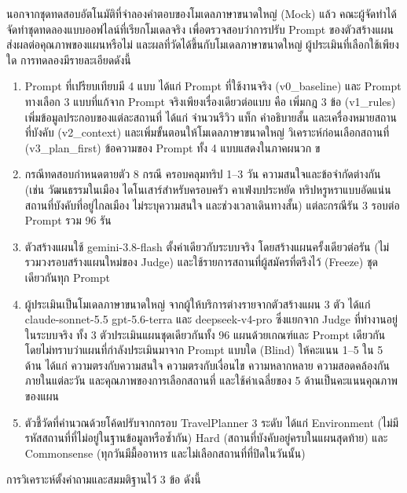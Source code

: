 นอกจากชุดทดสอบอัตโนมัติที่จำลองคำตอบของโมเดลภาษาขนาดใหญ่ (Mock) แล้ว คณะผู้จัดทำได้จัดทำชุดทดลองแบบออฟไลน์ที่เรียกโมเดลจริง เพื่อตรวจสอบว่าการปรับ Prompt ของตัวสร้างแผนส่งผลต่อคุณภาพของแผนหรือไม่ และผลที่วัดได้ขึ้นกับโมเดลภาษาขนาดใหญ่ ผู้ประเมินที่เลือกใช้เพียงใด การทดลองมีรายละเอียดดังนี้

\begin{enumerate}
\item Prompt ที่เปรียบเทียบมี 4 แบบ ได้แก่ Prompt ที่ใช้งานจริง (v0\_baseline) และ Prompt ทางเลือก 3 แบบที่แก้จาก Prompt จริงเพียงเรื่องเดียวต่อแบบ คือ เพิ่มกฎ 3 ข้อ (v1\_rules) เพิ่มข้อมูลประกอบของแต่ละสถานที่ ได้แก่ จำนวนรีวิว แท็ก คำอธิบายสั้น และเครื่องหมายสถานที่บังคับ (v2\_context) และเพิ่มขั้นตอนให้โมเดลภาษาขนาดใหญ่ วิเคราะห์ก่อนเลือกสถานที่ (v3\_plan\_first) ข้อความของ Prompt ทั้ง 4 แบบแสดงในภาคผนวก ข
\item กรณีทดสอบกำหนดตายตัว 8 กรณี ครอบคลุมทริป 1--3 วัน ความสนใจและข้อจำกัดต่างกัน (เช่น วัฒนธรรมในเมือง ไดโนเสาร์สำหรับครอบครัว คาเฟ่งบประหยัด ทริปหรูหราแบบอัดแน่น สถานที่บังคับที่อยู่ไกลเมือง ไม่ระบุความสนใจ และช่วงเวลาเดินทางสั้น) แต่ละกรณีรัน 3 รอบต่อ Prompt รวม 96 รัน
\item ตัวสร้างแผนใช้ gemini-3.8-flash ตั้งค่าเดียวกับระบบจริง โดยสร้างแผนครั้งเดียวต่อรัน (ไม่รวมวงรอบสร้างแผนใหม่ของ Judge) และใช้รายการสถานที่ผู้สมัครที่ตรึงไว้ (Freeze) ชุดเดียวกันทุก Prompt
\item ผู้ประเมินเป็นโมเดลภาษาขนาดใหญ่ จากผู้ให้บริการต่างรายจากตัวสร้างแผน 3 ตัว ได้แก่ claude-sonnet-5.5 gpt-5.6-terra และ deepseek-v4-pro ซึ่งแยกจาก Judge ที่ทำงานอยู่ในระบบจริง ทั้ง 3 ตัวประเมินแผนชุดเดียวกันทั้ง 96 แผนด้วยเกณฑ์และ Prompt เดียวกัน โดยไม่ทราบว่าแผนที่กำลังประเมินมาจาก Prompt แบบใด (Blind) ให้คะแนน 1--5 ใน 5 ด้าน ได้แก่ ความตรงกับความสนใจ ความตรงกับเงื่อนไข ความหลากหลาย ความสอดคล้องกันภายในแต่ละวัน และคุณภาพของการเลือกสถานที่ และใช้ค่าเฉลี่ยของ 5 ด้านเป็นคะแนนคุณภาพของแผน
\item ตัวชี้วัดที่คำนวณด้วยโค้ดปรับจากกรอบ TravelPlanner 3 ระดับ ได้แก่ Environment (ไม่มีรหัสสถานที่ที่ไม่อยู่ในฐานข้อมูลหรือซ้ำกัน) Hard (สถานที่บังคับอยู่ครบในแผนสุดท้าย) และ Commonsense (ทุกวันมีมื้ออาหาร และไม่เลือกสถานที่ที่ปิดในวันนั้น)
\end{enumerate}

การวิเคราะห์ตั้งคำถามและสมมติฐานไว้ 3 ข้อ ดังนี้


